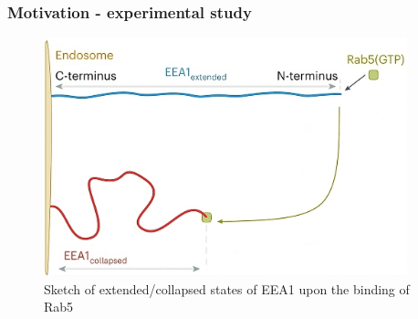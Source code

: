 \documentclass[handout]{beamer}
\begin{document}

\begin{frame}
    \frametitle{Motivation - experimental study}
    \begin{figure}[h]
        \includegraphics[height=6.9cm]{./Singh_intro_a.png}
        \caption{
            Sketch of extended/collapsed states of EEA1 upon the binding of Rab5
            \cite{Singh:2022}
        }
    \end{figure}
\end{frame}

\end{document}
